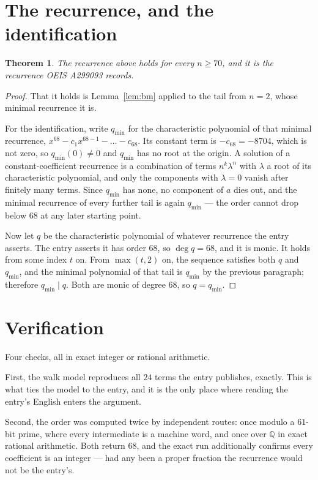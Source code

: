 \documentclass[11pt,a4paper]{article}
\theoremstyle{plain}
\newtheorem{theorem}{Theorem}
\theoremstyle{definition}
\begin{document}
\section{The recurrence, and the identification}

\begin{theorem}
The recurrence above holds for every $n\ge70$, and it is the recurrence OEIS A299093 records.
\end{theorem}

\begin{proof}
That it holds is Lemma~\ref{lem:bm} applied to the tail from $n=2$, whose minimal
recurrence it is.

For the identification, write $q_{\min}$ for the characteristic polynomial of that minimal
recurrence, $x^{68}-c_1x^{68-1}-\dots-c_{68}$. Its constant term is
$-c_{68}=-8704$, which is not zero, so $q_{\min}(0)\neq0$ and $q_{\min}$ has no
root at the origin. A solution of a constant-coefficient recurrence is a combination of terms
$n^{k}\lambda^{n}$ with $\lambda$ a root of its characteristic polynomial, and only the
components with $\lambda=0$ vanish after finitely many terms. Since $q_{\min}$ has none, no
component of $a$ dies out, and the minimal recurrence of every further tail is again
$q_{\min}$ --- the order cannot drop below $68$ at any later starting point.

Now let $q$ be the characteristic polynomial of whatever recurrence the entry asserts. The
entry asserts it has order $68$, so $\deg q=68$, and it is monic. It holds from some
index $t$ on. From $\max(t,2)$ on, the sequence satisfies both $q$ and $q_{\min}$, and
the minimal polynomial of that tail is $q_{\min}$ by the previous paragraph; therefore
$q_{\min}\mid q$. Both are monic of degree $68$, so $q=q_{\min}$.
\end{proof}

\section{Verification}

Four checks, all in exact integer or rational arithmetic.

First, the walk model reproduces all $24$ terms the entry publishes, exactly. This is
what ties the model to the entry, and it is the only place where reading the entry's English
enters the argument.

Second, the order was computed twice by independent routes: once modulo a $61$-bit prime, where
every intermediate is a machine word, and once over $\mathbb{Q}$ in exact rational arithmetic.
Both return $68$, and the exact run additionally confirms every coefficient is an integer
--- had any been a proper fraction the recurrence would not be the entry's.
\end{document}
